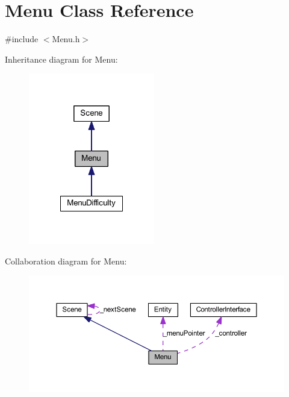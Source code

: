 \hypertarget{class_menu}{
\section{Menu Class Reference}
\label{d2/db8/class_menu}
}


{\ttfamily \#include $<$Menu.h$>$}



Inheritance diagram for Menu:
\nopagebreak
\begin{figure}[H]
\begin{center}
\leavevmode
\includegraphics[width=156pt]{da/d46/class_menu__inherit__graph}
\end{center}
\end{figure}


Collaboration diagram for Menu:
\nopagebreak
\begin{figure}[H]
\begin{center}
\leavevmode
\includegraphics[width=367pt]{d4/db9/class_menu__coll__graph}
\end{center}
\end{figure}
